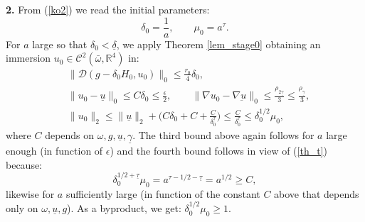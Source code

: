 \documentclass[reqno,twoside,11pt]{amsart}
\newcommand{\R}{\mathbb{R}}
\numberwithin{equation}{section}
\theoremstyle{plain}
\theoremstyle{definition}
\begin{document}
{\bf 2.} From (\ref{ko2}) we read the initial parameters:
$$\delta_0 = \frac{1}{a},\qquad \mu_0 = a^\tau.$$
For $a$ large so that $\delta_0<\underline\delta$, we apply Theorem \ref{lem_stage0} 
obtaining an immersion $u_0\in\mathcal{C}^2(\bar\omega,\R^4)$ in:
\begin{equation}\label{ko5}
\begin{split}
& \|\mathcal{D}(g-\delta_0H_0, u_0)\|_0\leq \frac{r_0}{4}\delta_0, \\
&\|u_0-\underline u\|_0 \leq C\delta_0\leq\frac{\epsilon}{2}, \qquad
\|\nabla u_0-\nabla\underbar u\|_0\leq
\frac{\rho_{2\underline\gamma}}{3}\leq \frac{\rho_{\underline\gamma}}{3},\\ 
& \|u_0\|_2\leq \|\underline u\|_2+ \Big(C\delta_0 + C +
\frac{C}{\delta_0^{\underline\tau}}\Big) \leq
\frac{C}{\delta_0^{\underline\tau}}\leq \delta_0^{1/2}\mu_0,
\end{split}
\end{equation}
where $C$ depends on $\omega, g, \underline u, \underline\gamma$.
The third bound above again follows for $a$ large enough (in function
of $\epsilon$) and the fourth bound follows in view of (\ref{th_t}) because:
$$\delta_0^{1/2+\underline\tau}\mu_0=a^{\tau-1/2- \underline\tau} = a^{1/2}\geq C,$$
likewise for $a$ sufficiently large (in function of the constant $C$
above that depends only on $\omega, \underline u, g$).
As a byproduct, we get: $\delta_0^{1/2}\mu_0\geq 1$.

\smallskip
\end{document}

